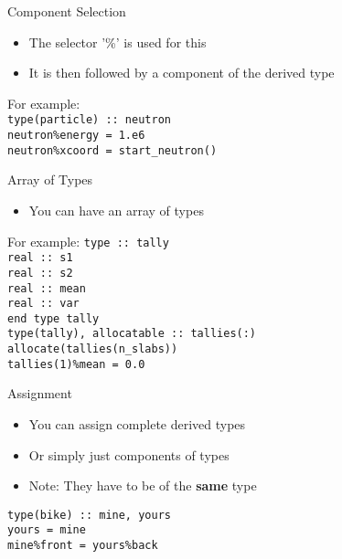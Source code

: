 \documentclass{beamer}
\begin{document}
\begin{frame}{Component Selection}

  \begin{itemize}
    \item The selector '\%' is used for this
    \vfill\item It is then followed by a component of the derived type
  \end{itemize}
  \vfill
  For example: \\
  \texttt{type(particle) :: neutron} \\
  \texttt{neutron\%energy = 1.e6} \\
  \texttt{neutron\%xcoord = start\_neutron()}
  \vfill
\end{frame}
\begin{frame}{Array of Types}

  \begin{itemize}
    \item You can have an array of types
  \end{itemize}
  \vfill
  For example:
  \texttt{type :: tally} \\
    \hspace{0.1cm} \texttt{real :: s1} \\
    \hspace{0.1cm} \texttt{real :: s2} \\
    \hspace{0.1cm} \texttt{real :: mean} \\
    \hspace{0.1cm} \texttt{real :: var} \\
  \texttt{end type tally} \\
  \texttt{type(tally), allocatable :: tallies(:)} \\
  \texttt{allocate(tallies(n\_slabs))} \\
  \texttt{tallies(1)\%mean = 0.0}
  \vfill

\end{frame}
\begin{frame}{Assignment}

  \begin{itemize}
    \item You can assign complete derived types
    \vfill\item Or simply just components of types
    \vfill\item \alert{Note:} They have to be of the \textbf{same} type
  \end{itemize}
  \vfill
  \texttt{type(bike) :: mine, yours} \\
  \texttt{yours = mine} \\
  \texttt{mine\%front = yours\%back}

\end{frame}
\end{document}
